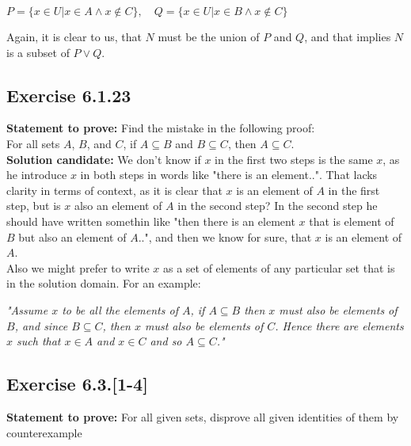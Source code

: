 \documentclass{report}
\newcommand{\cent}[1]{\begin{center}#1\end{center}}
\newcommand{\In}{\! \in \!}
\newcommand{\Prove}{\textbf{Statement to prove: }}
\newcommand{\solution}{\textbf{Solution candidate: }}
\newcommand{\QED}{\boxed{}}
\newcommand{\Exercise}[1]{\subsection{Exercise #1}}
\begin{document}
	\cent{$P = \{x \In U | x \In A \wedge x \notin C\}, \quad Q = \{x \In U | x \In B \wedge x \notin C\}$}
	
	Again, it is clear to us, that $N$ must be the union of $P$ and $Q$, and that implies $N$ is a subset of $P \vee Q$.\\
	\QED
	
	\Exercise{6.1.23}
	
	\Prove
	Find the mistake in the following proof:\\
	
	For all sets $A$, $ B $, and $ C $, if $ A \subseteq B $ and $ B \subseteq C $, then $ A \subseteq C $.\\
	
	\solution
	We don't know if $x$ in the first two steps is the same $x$, as he introduce $x$ in both steps in words like  "there is an element..". That lacks clarity in terms of context, as it is clear that $x$ is an element of  $A$ in the first step, but is $x$ also an element of $A$ in the second step? In the second step he should have written somethin like "then there is an element $ x $ that is element of $ B $ but also an element of $ A $..", and then we know for sure, that $x$ is an element of $A$.\\
	
	Also we might prefer to write $x$ as a set of elements of any particular set that is in the solution domain. For an example:
	
	\begin{center}
		\textit{"Assume $ x $ to be all the elements of $ A $, if $ A \subseteq B$ then $x$ must also be elements of $B$, and since $B \subseteq C$, then $x$ must also be elements of $C$. Hence there are elements $x$ such that $ x \In A $ and $ x \In C $ and so $ A \subseteq C $."}
	\end{center}

	\Exercise{6.3.[1-4]}
	
	\Prove
	For all given sets, disprove all given identities of them by counterexample
	
\end{document}
